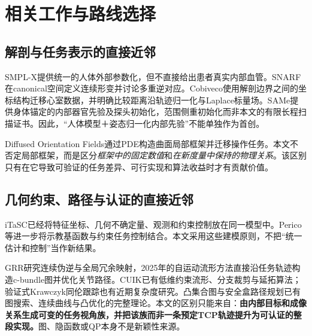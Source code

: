 \documentclass[UTF8,11pt,a4paper,fontset=fandol]{ctexart}
\numberwithin{equation}{section}
\theoremstyle{definition}
\begin{document}
\section{相关工作与路线选择}
\subsection{解剖与任务表示的直接近邻}
SMPL-X提供统一的人体外部参数化，但不直接给出患者真实内部血管\cite{smplx2019}。SNARF在canonical空间定义连续形变并讨论多重逆对应\cite{snarf2021}。Cobiveco使用解剖边界之间的坐标结构迁移心室数据，并明确比较距离沿轨迹归一化与Laplace标量场\cite{cobiveco2021}。SAMe提供身体锚定的内部器官先验及探头初始化，范围侧重初始化而非本文的有限长程扫描证书\cite{same2026}。因此，“人体模型＋姿态归一化内部先验”不能单独作为首创。

Diffused Orientation Fields通过PDE构造曲面局部框架并迁移操作任务\cite{dof2026}。本文不否定局部框架，而是区分\emph{框架中的固定数值}和\emph{在新度量中保持的物理关系}。该区别只有在它导致可验证的任务差异、可行实现和算法收益时才有贡献价值。

\subsection{几何约束、路径与认证的直接近邻}
iTaSC已经将特征坐标、几何不确定量、观测和约束控制放在同一模型中\cite{itasc2007}。Perico等进一步将示教基函数与约束任务控制结合\cite{perico2019}。本文采用这些建模原则，不把“统一估计和控制”当作新结果。

GRR研究连续伪逆与全局冗余映射\cite{grr2018}，2025年的自运动流形方法直接沿任务轨迹构造c-bundle图并优化关节路径\cite{smm2025}。CUIK已有低维约束流形、分支裁剪与延拓算法\cite{cuik2014}；验证式Krawczyk同伦跟踪也有近期复杂度研究\cite{krawczyk2025}。凸集合图与安全盒路径规划已有图搜索、连续曲线与凸优化的完整理论\cite{gcs2024,safebox2024}。本文的区别只能来自：\textbf{由内部目标和成像关系生成可变的任务视角族，并把该族而非一条预定TCP轨迹提升为可认证的整段实现。}图、隐函数或QP本身不是新颖性来源。
\end{document}
